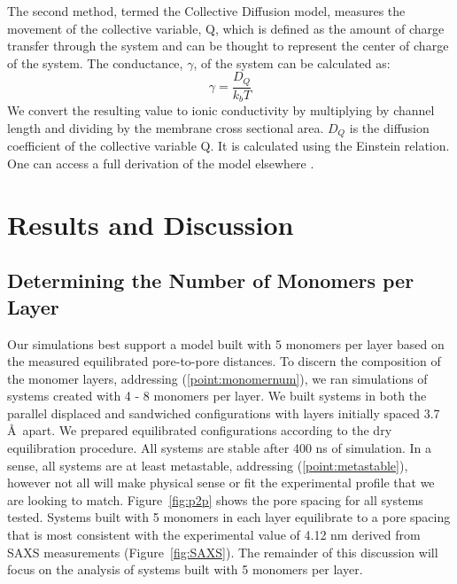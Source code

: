 \documentclass{article}
\begin{document}
  The second method, termed the Collective Diffusion model, measures the
  movement of the collective variable, Q, which is defined as the amount of
  charge transfer through the system and can be thought to represent the center
  of charge of the system. The conductance, $\gamma$, of the system can be
  calculated as: $$ \gamma = \dfrac{D_Q}{k_b T} $$ We convert the resulting value
  to ionic conductivity by multiplying by channel length and dividing by the
  membrane cross sectional area. $D_Q$ is the diffusion coefficient of the
  collective variable Q. It is calculated using the Einstein relation. One can
  access a full derivation of the model elsewhere \cite{liu_collective_2013}.

  \section{Results and Discussion}
  
  \subsection{Determining the Number of Monomers per Layer}

  Our simulations best support a model built with 5 monomers per layer based on
  the measured equilibrated pore-to-pore distances. To discern the composition of
  the monomer layers, addressing (\ref{point:monomernum}), we ran simulations of
  systems created with 4 - 8 monomers per layer. We built systems in both the
  parallel displaced and sandwiched configurations with layers initially spaced
  3.7 \AA~apart. We prepared equilibrated configurations according to the dry
  equilibration procedure. All systems are stable after 400 ns of simulation. In
  a sense, all systems are at least metastable, addressing
  (\ref{point:metastable}), however not all will make physical sense or fit the
  experimental profile that we are looking to match. Figure~\ref{fig:p2p} shows
  the pore spacing for all systems tested. Systems built with 5 monomers in each
  layer equilibrate to a pore spacing that is most consistent with the
  experimental value of 4.12 nm derived from SAXS measurements
  (Figure~\ref{fig:SAXS}). The remainder of this discussion will focus on the
  analysis of systems built with 5 monomers per layer.
\end{document}
